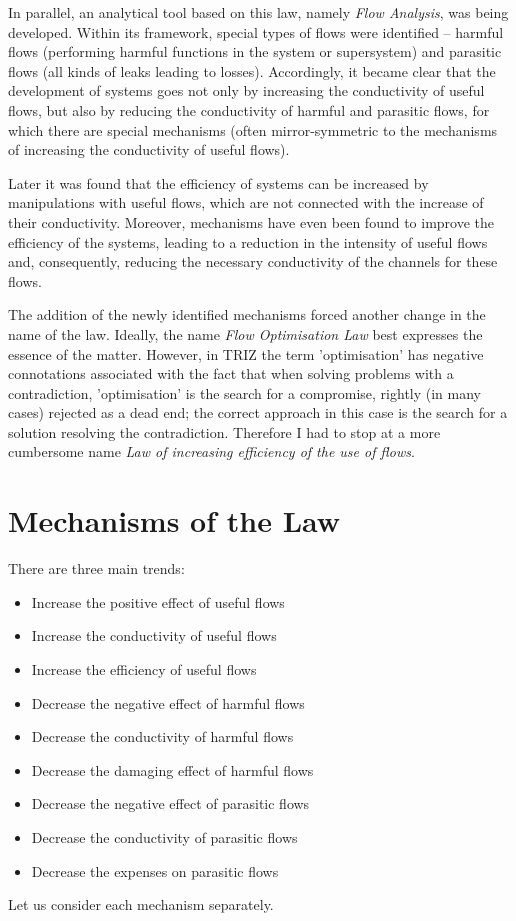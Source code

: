 \documentclass[a4paper,11pt]{article}
\begin{document}
In parallel, an analytical tool based on this law, namely \emph{Flow
  Analysis}, was being developed. Within its framework, special types of flows
were identified -- harmful flows (performing harmful functions in the system
or supersystem) and parasitic flows (all kinds of leaks leading to losses).
Accordingly, it became clear that the development of systems goes not only by
increasing the conductivity of useful flows, but also by reducing the
conductivity of harmful and parasitic flows, for which there are special
mechanisms (often mirror-symmetric to the mechanisms of increasing the
conductivity of useful flows).

Later it was found that the efficiency of systems can be increased by
manipulations with useful flows, which are not connected with the increase of
their conductivity. Moreover, mechanisms have even been found to improve the
efficiency of the systems, leading to a reduction in the intensity of useful
flows and, consequently, reducing the necessary conductivity of the channels
for these flows.

The addition of the newly identified mechanisms forced another change in the
name of the law. Ideally, the name \emph{Flow Optimisation Law} best expresses
the essence of the matter. However, in TRIZ the term 'optimisation' has
negative connotations associated with the fact that when solving problems with
a contradiction, 'optimisation' is the search for a compromise, rightly (in
many cases) rejected as a dead end; the correct approach in this case is the
search for a solution resolving the contradiction. Therefore I had to stop at
a more cumbersome name \emph{Law of increasing efficiency of the use of
  flows}.

\section*{Mechanisms of the Law}

There are three main trends:
\begin{itemize}
\item Increase the positive effect of useful flows
\item Increase the conductivity of useful flows
\item Increase the efficiency of useful flows
\item Decrease the negative effect of harmful flows
\item Decrease the conductivity of harmful flows
\item Decrease the damaging effect of harmful flows
\item Decrease the negative effect of parasitic flows
\item Decrease the conductivity of parasitic flows
\item Decrease the expenses on parasitic flows
\end{itemize}
Let us consider each mechanism separately.
\end{document}
